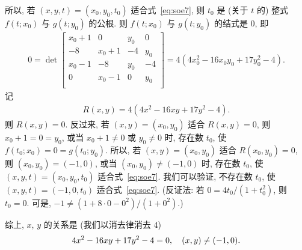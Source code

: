\documentclass[../libro.tex]{subfiles}
\begin{document}
\begin{example}
    所以,
    若 \((x, y, t) = (x_0, y_0, t_0)\) 适合式~\eqref{eq:soe7},
    则 \(t_0\) 是 (关于 \(t\) 的) 整式
    \(f(t; x_0)\) 与 \(g(t; y_0)\)
    的公根.
    则 \(f(t; x_0)\) 与 \(g(t; y_0)\)
    的结式是 \(0\), 即
    \begin{align*}
        0 =
        \det {
            \begin{bmatrix}
                x_0+1 & 0     & y_0  & 0   \\
                -8    & x_0+1 & -4   & y_0 \\
                x_0-1 & -8    & y_0  & -4  \\
                0     & x_0-1 & 0    & y_0 \\
            \end{bmatrix}
        }
        = 4 (4 x_0^2 - 16 x_0 y_0 + 17 y_0^2 - 4).
    \end{align*}
    记
    \begin{align*}
        R(x, y) = 4 (4 x^2 - 16 x y + 17 y^2 - 4).
    \end{align*}
    则 \(R(x, y) = 0\).
    反过来,
    若 \((x, y) = (x_0, y_0)\) 适合 \(R(x, y) = 0\),
    则 \(x_0 + 1 = 0 = y_0\),
    或当 \(x_0 + 1 \neq 0\) 或 \(y_0 \neq 0\) 时,
    存在数 \(t_0\),
    使 \(f(t_0; x_0) = 0 = g(t_0; y_0)\).
    所以,
    若 \((x, y) = (x_0, y_0)\) 适合 \(R(x_0, y_0) = 0\),
    则 \((x_0, y_0) = (-1, 0)\),
    或当 \((x_0, y_0) \neq (-1, 0)\) 时,
    存在数 \(t_0\),
    使 \((x, y, t) = (x_0, y_0, t_0)\) 适合式~\eqref{eq:soe7}.
    我们可以验证, 不存在数 \(t_0\),
    使 \((x, y, t) = (-1, 0, t_0)\) 适合式~\eqref{eq:soe7}.
    (反证法: 若 \(0 = 4t_0/(1 + t_0^2)\), %
    则 \(t_0 = 0\).
    可是, \(-1 \neq (1 + 8 \cdot 0 - 0^2) %
    / (1 + 0^2)\).) %

    综上, \(x\), \(y\) 的关系是
    (我们以消去律消去 \(4\))
    \begin{equation*}
        4 x^2 - 16 x y + 17 y^2 - 4 = 0,
        \quad
        (x, y) \neq (-1, 0).
        \qedhere
    \end{equation*}
\end{example}
\end{document}
